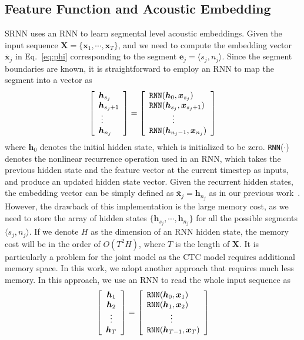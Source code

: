 \documentclass[a4paper]{article}
\begin{document}
\subsection{Feature Function and Acoustic Embedding}

SRNN uses an RNN to learn segmental level acoustic embeddings. Given the input sequence ${\bm X} = \{{\bm x}_1, \cdots, {\bm x}_T\}$, and we need to compute the embedding vector $\bar{\bm x}_j$ in Eq.~\eqref{eq:phi} corresponding to the segment ${\bm e}_j = \langle s_j, n_j\rangle$. Since the segment boundaries are known, it is straightforward to employ an RNN to map the segment into a vector as 
\begin{align}
\left [ \begin{array}{l}
{\bm h}_{s_j}  \\
{\bm h}_{s_j+1}  \\
\hskip1mm \vdots \\
{\bm h}_{n_j}   
\end{array} \right] = 
\left [ \begin{array}{l}
  \text{\tt RNN}({\bm h}_0, {\bm x}_{s_j}) \\
  \text{\tt RNN}({\bm h}_{s_j}, {\bm x}_{s_j+1}) \\
  \hskip1cm \vdots \\
  \text{\tt RNN}({\bm h}_{n_j-1}, {\bm x}_{n_j}) 
\end{array} \right]
\end{align}
where ${\bm h}_0$ denotes the initial hidden state, which is initialized to be zero. {\tt RNN}($\cdot$) denotes the nonlinear recurrence operation used in an RNN, which takes the previous hidden state and the feature vector at the current timestep as inputs, and produce an updated hidden state vector. Given the recurrent hidden states, the embedding vector can be simply defined as $\bar{\bm x}_j= {\bm h}_{n_j}$ as in our previous work~\cite{lu2016segmental}. However, the drawback of this implementation is the large memory cost, as we need to store the array of hidden states $\{{\bm h}_{s_j}, \cdots, {\bm h}_{n_j}\}$ for all the possible segments $\langle s_j, n_j\rangle$. If we denote $H$ as the dimension of an RNN hidden state, the memory cost will be in the order of $O(T^2H)$, where $T$ is the length of $\bm X$. It is particularly a problem for the joint model as the CTC model requires additional memory space. In this work, we adopt another approach that requires much less memory. In this approach, we use an RNN to read the whole input sequence as 
\begin{align}
\left [ \begin{array}{c}
{\bm h}_{1}  \\
{\bm h}_{2}  \\
\vdots \\
{\bm h}_{T}   
\end{array} \right] = 
\left [ \begin{array}{l}
  \text{\tt RNN}({\bm h}_0, {\bm x}_{1}) \\
  \text{\tt RNN}({\bm h}_1, {\bm x}_{2}) \\
 \hskip1cm \vdots \\
  \text{\tt RNN}({\bm h}_{T-1}, {\bm x}_{T}) 
\end{array} \right]
\end{align}
\end{document}
